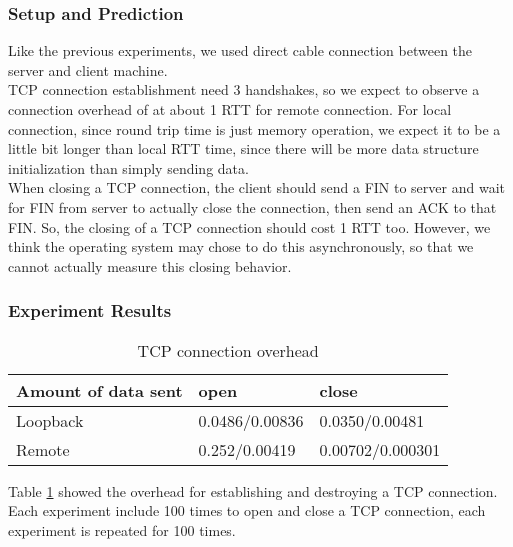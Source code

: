 \documentclass{article} %
\begin{document}
\subsubsection{Setup and Prediction}
Like the previous experiments, we used direct cable connection between the server and client machine.\\
TCP connection establishment need 3 handshakes, so we expect to observe a connection overhead of at about 1 RTT for remote connection. For local connection, since round trip time is just memory operation, we expect it to be a little bit longer than local RTT time, since there will be more data structure initialization than simply sending data.\\
When closing a TCP connection, the client should send a FIN to server and wait for FIN from server to actually close the connection, then send an ACK to that FIN. So, the closing of a TCP connection should cost 1 RTT too. However, we think the operating system may chose to do this asynchronously, so that we cannot actually measure this closing behavior.\\

\subsubsection{Experiment Results}

\begin{table}
  \begin{center}
    \caption{TCP connection overhead}
    \begin{tabular}{|l|l|l|}
      \hline
      Amount of data sent & open           & close            \\ \hline
      Loopback            & 0.0486/0.00836 & 0.0350/0.00481   \\ \hline
      Remote              & 0.252/0.00419  & 0.00702/0.000301 \\ \hline
    \end{tabular}
    \label{table:tcp_overhead}
  \end{center}
\end{table}

Table \ref{table:tcp_overhead} showed the overhead for establishing and destroying a TCP connection. Each experiment include 100 times to open and close a TCP connection, each experiment is repeated for 100 times.\\
\end{document}
